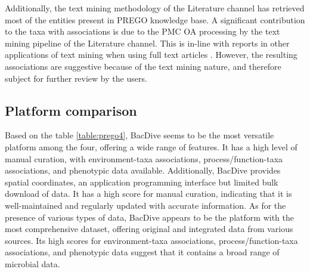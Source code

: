 
   Additionally, the text mining methodology of the Literature channel has retrieved most of the entities present in PREGO knowledge base. 
   A significant contribution to the taxa with associations is due to the PMC OA processing by the text mining pipeline of the Literature channel. 
   This is in-line with reports in other applications of text mining when using full text articles \parencite{westergaard2018comprehensive}. 
   However, the resulting associations are suggestive because of the text mining nature, and therefore subject for further review by the users.

   \subsection{Platform comparison}
   \label{subsec:prego-similar-platforms}


Based on the table \ref{table:prego4}, BacDive seems to be the most versatile
platform among the four, offering a wide range of features. It has a high level
of manual curation, with environment-taxa associations, process/function-taxa
associations, and phenotypic data available. Additionally, BacDive provides
spatial coordinates, an application programming interface but limited bulk download of data.
It has a high score for manual curation, indicating that it is well-maintained and regularly updated with accurate information.
As for the presence of various types of data, BacDive appears to be the platform
with the most comprehensive dataset, offering original and integrated data from
various sources. Its high scores for environment-taxa associations,
process/function-taxa associations, and phenotypic data suggest that it contains a broad range of microbial data.

